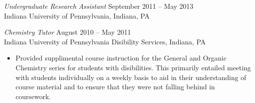\documentclass[10pt]{res} %
\begin{document}
\begin{resume}
{\sl Undergraduate Research Assistant} \hfill September 2011 -- May 2013 \\
Indiana University of Pennsylvania, Indiana, PA

{\sl Chemistry Tutor} \hfill August 2010 -- May 2011 \\
Indiana University of Pennsylvania Disibility Services, Indiana, PA 
\begin{itemize}
  \item Provided supplimental course instruction for the General and Organic Chemistry
    series for students with disibilities. This primarily entailed meeting with students
    individually on a weekly basis to aid in their understanding of course material and 
    to ensure that they were not falling behind in coursework.
\end{itemize}


\end{resume}
\end{document}
